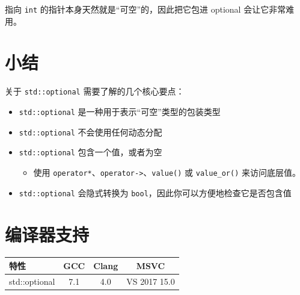 指向 \texttt{int} 的指针本身天然就是“可空”的，因此把它包进 optional 会让它非常难用。

\section{小结}
关于 \texttt{std::optional} 需要了解的几个核心要点：
\begin{itemize}
\item \texttt{std::optional} 是一种用于表示“可空”类型的包装类型
\item \texttt{std::optional} 不会使用任何动态分配
\item \texttt{std::optional} 包含一个值，或者为空
\begin{itemize}
\item 使用 \texttt{operator*}、\texttt{operator->}、\texttt{value()} 或 \texttt{value\_or()} 来访问底层值。
\end{itemize}
\item \texttt{std::optional} 会隐式转换为 \texttt{bool}，因此你可以方便地检查它是否包含值
\end{itemize}

\section{编译器支持}
\begin{table}[H]
\centering
\begin{tabularx}{\textwidth}{X c c c}
\toprule
特性 & GCC & Clang & MSVC \\
\midrule
std::optional & 7.1 & 4.0 & VS 2017 15.0 \\
\bottomrule
\end{tabularx}
\end{table}

